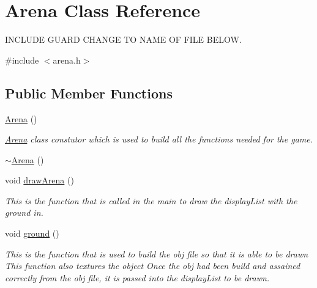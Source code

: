 \hypertarget{classArena}{
\section{Arena Class Reference}
\label{classArena}
}


INCLUDE GUARD CHANGE TO NAME OF FILE BELOW.  


{\ttfamily \#include $<$arena.h$>$}\subsection*{Public Member Functions}
\begin{DoxyCompactItemize}
\item 
\hyperlink{classArena_a74f105bc709d4728fb07f1984abfd345}{Arena} ()
\begin{DoxyCompactList}\small\item\em \hyperlink{classArena}{Arena} class constutor which is used to build all the functions needed for the game. \item\end{DoxyCompactList}\item 
\hyperlink{classArena_ae21b399e9e3f6b8ac4ecc44d7d1667fc}{$\sim$Arena} ()
\item 
\hypertarget{classArena_a487d2ea4efecb2c7e66dbecfe8c55f81}{
void \hyperlink{classArena_a487d2ea4efecb2c7e66dbecfe8c55f81}{drawArena} ()}
\label{classArena_a487d2ea4efecb2c7e66dbecfe8c55f81}

\begin{DoxyCompactList}\small\item\em This is the function that is called in the main to draw the displayList with the ground in. \item\end{DoxyCompactList}\item 
\hypertarget{classArena_a1887998f5f563b1d68f8f83e76b75b0b}{
void \hyperlink{classArena_a1887998f5f563b1d68f8f83e76b75b0b}{ground} ()}
\label{classArena_a1887998f5f563b1d68f8f83e76b75b0b}

\begin{DoxyCompactList}\small\item\em This is the function that is used to build the obj file so that it is able to be drawn This function also textures the object Once the obj had been build and assained correctly from the obj file, it is passed into the displayList to be drawn. \item\end{DoxyCompactList}\end{DoxyCompactItemize}

